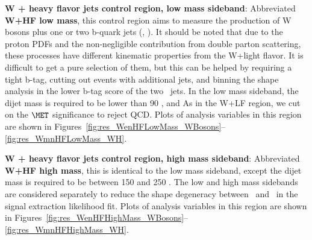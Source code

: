 \textbf{W + heavy flavor jets control region, low mass sideband}: Abbreviated \textbf{W+HF low mass}, this control region aims
to measure the production of W bosons plus one or two b-quark jets (\Wb, \Wbb).
It should be noted that due to the proton PDFs and the non-negligible contribution from double parton scattering, 
these processes have different kinematic properties from the W+light flavor.
It is difficult to get a pure selection of them, but this can be helped by requiring a tight b-tag,
cutting out events with additional jets, and binning the shape analysis in the lower b-tag score of the two \HBB\ jets.
In the low mass sideband, the dijet mass is required to be lower than 90 \GeV, and 
As in the W+LF region, we cut on the $\MET$ significance to reject QCD.
Plots of analysis variables in this region are shown in Figures~\ref{fig:res_WenHFLowMass_WBosons}--\ref{fig:res_WmnHFLowMass_WH}.

\textbf{W + heavy flavor jets control region, high mass sideband}: Abbreviated \textbf{W+HF high mass}, this is identical to the
low mass sideband, except the dijet mass is required to be between 150 and 250 \GeV.
The low and high mass sidebands are considered separately to reduce the shape degeneracy between
\Wb\ and \Wbb\ in the signal extraction likelihood fit.
Plots of analysis variables in this region are shown in Figures~\ref{fig:res_WenHFHighMass_WBosons}--\ref{fig:res_WmnHFHighMass_WH}.

